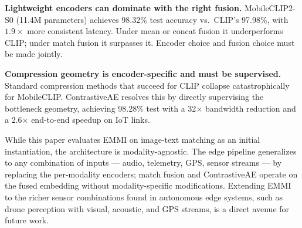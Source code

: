 \documentclass[10pt,twocolumn]{article}
\begin{document}
\textbf{Lightweight encoders can dominate with the right fusion.}
MobileCLIP2-S0 (11.4M parameters) achieves 98.32\% test accuracy
vs.\ CLIP's 97.98\%, with $1.9\times$ more consistent latency. Under
mean or concat fusion it underperforms CLIP; under match fusion it
surpasses it. Encoder choice and fusion choice must be made jointly.

\textbf{Compression geometry is encoder-specific and must be supervised.}
Standard compression methods that succeed for CLIP collapse catastrophically
for MobileCLIP. ContrastiveAE resolves this by directly supervising the
bottleneck geometry, achieving 98.28\% test with a 32$\times$ bandwidth
reduction and a 2.6$\times$ end-to-end speedup on IoT links.

While this paper evaluates EMMI on image-text matching as an initial
instantiation, the architecture is modality-agnostic. The edge pipeline
generalizes to any combination of inputs --- audio, telemetry, GPS,
sensor streams --- by replacing the per-modality encoders; match fusion
and ContrastiveAE operate on the fused embedding without
modality-specific modifications. Extending EMMI to the richer sensor
combinations found in autonomous edge systems, such as drone perception
with visual, acoustic, and GPS streams, is a direct avenue for future work.



\end{document}
